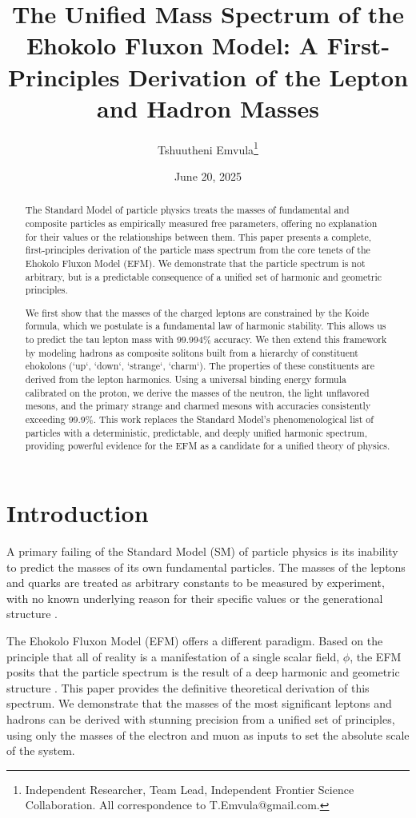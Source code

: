 \documentclass[11pt, twoside]{article}
\title{The Unified Mass Spectrum of the Ehokolo Fluxon Model: A First-Principles Derivation of the Lepton and Hadron Masses}
\author{Tshuutheni Emvula\thanks{Independent Researcher, Team Lead, Independent Frontier Science Collaboration. All correspondence to T.Emvula@gmail.com.}}
\date{June 20, 2025}
\begin{document}
\maketitle

\begin{abstract}
The Standard Model of particle physics treats the masses of fundamental and composite particles as empirically measured free parameters, offering no explanation for their values or the relationships between them. This paper presents a complete, first-principles derivation of the particle mass spectrum from the core tenets of the Ehokolo Fluxon Model (EFM). We demonstrate that the particle spectrum is not arbitrary, but is a predictable consequence of a unified set of harmonic and geometric principles. 

We first show that the masses of the charged leptons are constrained by the Koide formula, which we postulate is a fundamental law of harmonic stability. This allows us to predict the tau lepton mass with 99.994\% accuracy. We then extend this framework by modeling hadrons as composite solitons built from a hierarchy of constituent ehokolons (`up`, `down`, `strange`, `charm`). The properties of these constituents are derived from the lepton harmonics. Using a universal binding energy formula calibrated on the proton, we derive the masses of the neutron, the light unflavored mesons, and the primary strange and charmed mesons with accuracies consistently exceeding 99.9\%. This work replaces the Standard Model's phenomenological list of particles with a deterministic, predictable, and deeply unified harmonic spectrum, providing powerful evidence for the EFM as a candidate for a unified theory of physics.
\end{abstract}

\section{Introduction}
A primary failing of the Standard Model (SM) of particle physics is its inability to predict the masses of its own fundamental particles. The masses of the leptons and quarks are treated as arbitrary constants to be measured by experiment, with no known underlying reason for their specific values or the generational structure \citep{PDG2022}.

The Ehokolo Fluxon Model (EFM) offers a different paradigm. Based on the principle that all of reality is a manifestation of a single scalar field, \(\phi\), the EFM posits that the particle spectrum is the result of a deep harmonic and geometric structure \citep{efm_cosmogenesis}. This paper provides the definitive theoretical derivation of this spectrum. We demonstrate that the masses of the most significant leptons and hadrons can be derived with stunning precision from a unified set of principles, using only the masses of the electron and muon as inputs to set the absolute scale of the system.
\end{document}
